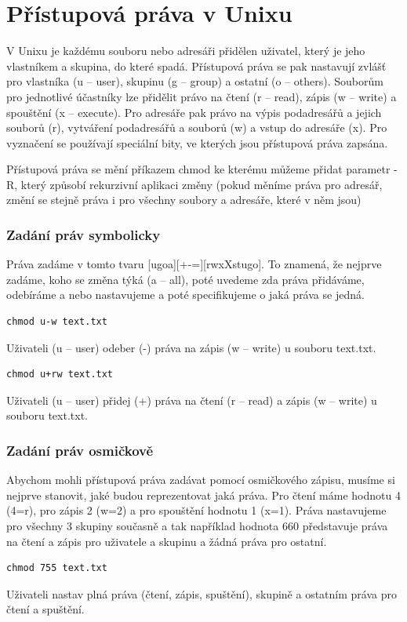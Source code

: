 \documentclass{article}
\begin{document}
\section{Přístupová práva v Unixu}
V Unixu je každému souboru nebo adresáři přidělen uživatel, který je jeho vlastníkem a skupina, do které spadá. Přístupová práva se pak nastavují zvlášť pro vlastníka (u -- user), skupinu (g -- group) a ostatní (o -- others). Souborům pro jednotlivé účastníky lze přidělit právo na čtení (r -- read), zápis (w -- write) a spouštění (x -- execute). Pro adresáře pak právo na výpis podadresářů a jejich souborů (r), vytváření podadresářů a souborů (w) a vstup do adresáře (x). Pro vyznačení se používají speciální bity, ve kterých jsou přístupová práva zapsána. 

Přístupová práva se mění příkazem chmod ke kterému můžeme přidat parametr -R, který způsobí rekurzivní aplikaci změny (pokud měníme práva pro adresář, změní se stejně práva i pro všechny soubory a adresáře, které v něm jsou)
\subsubsection{Zadání práv symbolicky}
Práva zadáme v tomto tvaru [ugoa][+-=][rwxXstugo]. To znamená, že nejprve zadáme, koho se změna týká (a -- all), poté uvedeme zda práva přidáváme, odebíráme a nebo nastavujeme a poté specifikujeme o jaká práva se jedná.
\begin{verbatim}
chmod u-w text.txt
\end{verbatim}
Uživateli (u -- user) odeber (-) práva na zápis (w -- write) u souboru text.txt.

\begin{verbatim}
chmod u+rw text.txt
\end{verbatim}
Uživateli (u -- user) přidej (+) práva na čtení (r -- read) a zápis (w -- write) u souboru text.txt.

\subsubsection{Zadání práv osmičkově}
Abychom mohli přístupová práva zadávat pomocí osmičkového zápisu, musíme si nejprve stanovit, jaké  budou reprezentovat jaká práva. Pro čtení máme hodnotu 4 (4=r), pro zápis 2 (w=2) a pro spouštění hodnotu 1 (x=1). Práva nastavujeme pro všechny 3 skupiny současně a tak například hodnota 660 představuje práva na čtení a zápis pro uživatele a skupinu a žádná práva pro ostatní.

\begin{verbatim}
chmod 755 text.txt
\end{verbatim}
Uživateli nastav plná práva (čtení, zápis, spuštění), skupině a ostatním práva pro čtení a spuštění.
\end{document}
